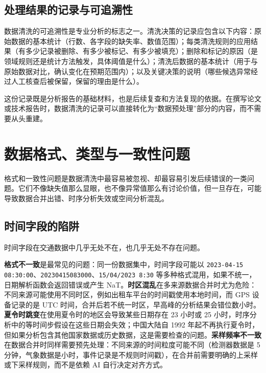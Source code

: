 \subsection{处理结果的记录与可追溯性}

数据清洗的可追溯性是专业分析的标志之一。清洗决策的记录应包含以下内容：原始数据的基本统计（行数、各字段的缺失率、数值范围）；每类清洗规则的应用结果（有多少记录被删除、有多少被标记、有多少被填充）；删除和标记的原因（是领域规则还是统计方法触发，具体阈值是什么）；清洗后数据的基本统计（用于与原始数据对比，确认变化在预期范围内）；以及关键决策的说明（哪些候选异常经过人工核查后被保留，保留的理由是什么）。

这份记录既是分析报告的基础材料，也是后续复查和方法复现的依据。在撰写论文或技术报告时，数据清洗的记录可以直接转化为“数据预处理”部分的内容，而不需要从头重建。

\section{数据格式、类型与一致性问题}

格式和一致性问题是数据清洗中最容易被忽视、却最容易引发后续错误的一类问题。它们不像缺失值那么显眼，也不像异常值那么有讨论价值，但一旦存在，可能导致数据合并出错、时序分析失效或空间分析混乱。

\subsection{时间字段的陷阱}

时间字段在交通数据中几乎无处不在，也几乎无处不存在问题。

\textbf{格式不一致}是最常见的问题：同一份数据集中，时间字段可能以 \texttt{2023-04-15 08:30:00}、\texttt{20230415083000}、\texttt{15/04/2023 8:30} 等多种格式混用，如果不统一，日期解析函数会返回错误或产生 NaT。\textbf{时区混乱}在多来源数据合并时尤为危险：不同来源可能使用不同时区，例如出租车平台的时间戳使用本地时间，而 GPS 设备记录的是 UTC 时间，合并后若不统一时区，早高峰的分析结果会错位数小时。\textbf{夏令时跳变}在使用夏令时的地区会导致某些日期存在 23 小时或 25 小时，时序分析中的等时间步假设在这些日期会失效；中国大陆自 1992 年起不再执行夏令时，但如果分析包含其他国家数据或历史数据，这是需要检查的问题。\textbf{采样频率不一致}在数据合并时同样需要预先处理：不同来源的时间粒度可能不同（检测器数据是 5 分钟，气象数据是小时，事件记录是不规则时间戳），在合并前需要明确的上采样或下采样规则，而不是依赖 AI 自行决定对齐方式。

